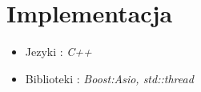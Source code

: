 \documentclass[11pt]{book}
\newcommand{\+}{\discretionary{\mbox{\scriptsize$\hookleftarrow$}}{}{}}
\begin{document}
\chapter{Implementacja}
\begin{itemize}
\item
Jezyki : \textsl{C++}
\item
Biblioteki : \textsl{Boost:Asio, std::thread}
\end{itemize}

\end{document}
